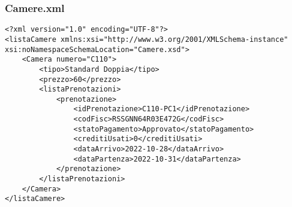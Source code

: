 \documentclass [a4paper, 12pt]{book}
\begin{document}
\subsubsection{Camere.xml}
\begin{lstlisting}[style=XML] 	
<?xml version="1.0" encoding="UTF-8"?>
<listaCamere xmlns:xsi="http://www.w3.org/2001/XMLSchema-instance" xsi:noNamespaceSchemaLocation="Camere.xsd">
    <Camera numero="C110">
        <tipo>Standard Doppia</tipo>
        <prezzo>60</prezzo>
        <listaPrenotazioni>
            <prenotazione>
                <idPrenotazione>C110-PC1</idPrenotazione>
                <codFisc>RSSGNN64R03E472G</codFisc>
                <statoPagamento>Approvato</statoPagamento>
                <creditiUsati>0</creditiUsati>
                <dataArrivo>2022-10-28</dataArrivo>
                <dataPartenza>2022-10-31</dataPartenza>
            </prenotazione>
        </listaPrenotazioni>
    </Camera>
</listaCamere>
\end{lstlisting}
\end{document}
